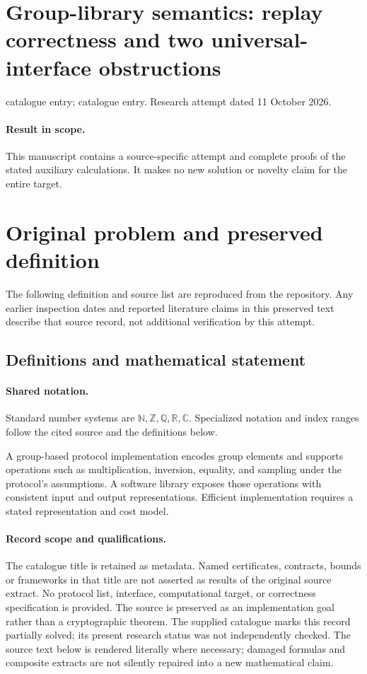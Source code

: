 \documentclass[11pt]{article}
\begin{document}
\section*{Group-library semantics: replay correctness and two universal-interface obstructions}
\noindent catalogue entry; catalogue entry. Research attempt dated 11 October 2026.
\paragraph{Result in scope.}This manuscript contains a source-specific attempt and complete proofs of the stated auxiliary calculations. It makes no new solution or novelty claim for the entire target.
\section{Original problem and preserved definition}
The following definition and source list are reproduced from the repository. Any earlier inspection dates and reported literature claims in this preserved text describe that source record, not additional verification by this attempt.
\subsection{Definitions and mathematical statement}

\paragraph{Shared notation.}Standard number systems are $\mathbb N,\mathbb Z,\mathbb Q,\mathbb R,\mathbb C$. Specialized notation and index ranges follow the cited source and the definitions below.


A group-based protocol implementation encodes group elements and supports operations such as multiplication, inversion, equality, and sampling under the protocol's assumptions. A software library exposes those operations with consistent input and output representations. Efficient implementation requires a stated representation and cost model.
\paragraph{Record scope and qualifications.}
The catalogue title is retained as metadata. Named certificates, contracts, bounds or frameworks in that title are not asserted as results of the original source extract.
No protocol list, interface, computational target, or correctness specification is provided. The source is preserved as an implementation goal rather than a cryptographic theorem. The supplied catalogue marks this record partially solved; its present research status was not independently checked.
The source text below is rendered literally where necessary; damaged formulas and composite extracts are not silently repaired into a new mathematical claim.
\end{document}
